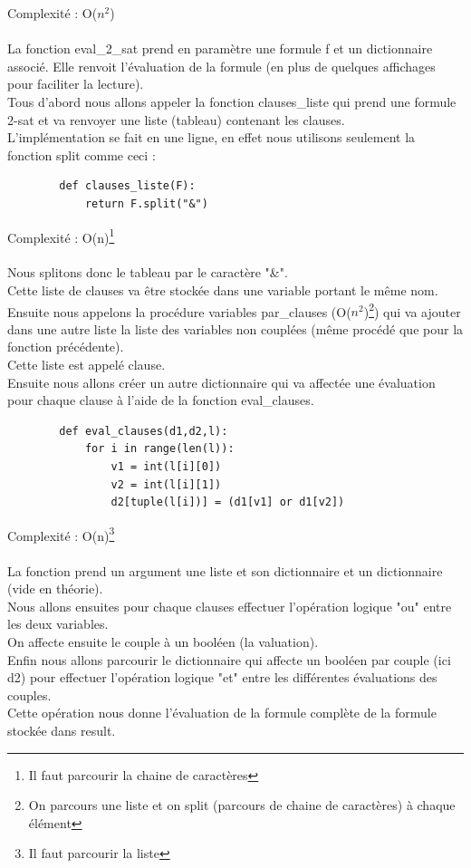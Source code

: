 \documentclass{article}
\begin{document}
    Complexité : O($n^2$) \\ \\
    La fonction eval\_2\_sat prend en paramètre une formule f et un dictionnaire associé. Elle renvoit l'évaluation de la formule (en plus de quelques affichages pour faciliter la lecture). \\
    Tous d'abord nous allons appeler la fonction clauses\_liste qui prend une formule 2-sat et va renvoyer une liste (tableau) contenant les clauses. \\
    L'implémentation se fait en une ligne, en effet nous utilisons seulement la fonction split comme ceci : 
    \begin{lstlisting}
        def clauses_liste(F):
            return F.split("&") 
    \end{lstlisting}
    Complexité : O(n)\footnote{Il faut parcourir la chaine de caractères} \\
    \\
    Nous splitons donc le tableau par le caractère "\&". \\
    Cette liste de clauses va être stockée dans une variable portant le même nom. \\ 
    Ensuite nous appelons la procédure variables par\_clauses (O($n^2$)\footnote{On parcours une liste et on split (parcours de chaine de caractères) à chaque élément}) qui va ajouter dans une autre liste la liste des variables non couplées (même procédé que pour la fonction précédente). \\
    Cette liste est appelé clause. \\
    Ensuite nous allons créer un autre dictionnaire qui va affectée une évaluation pour chaque clause à l'aide de la fonction eval\_clauses. \\
    \begin{lstlisting}
        def eval_clauses(d1,d2,l):
            for i in range(len(l)):
                v1 = int(l[i][0])
                v2 = int(l[i][1])
                d2[tuple(l[i])] = (d1[v1] or d1[v2])
    \end{lstlisting}
    Complexité : O(n)\footnote{Il faut parcourir la liste} \\
    \\
    La fonction prend un argument une liste et son dictionnaire et un dictionnaire (vide en théorie). \\
    Nous allons ensuites pour chaque clauses effectuer l'opération logique "ou" entre les deux variables. \\
    On affecte ensuite le couple à un booléen (la valuation). \\
    Enfin nous allons parcourir le dictionnaire qui affecte un booléen par couple (ici d2) pour effectuer l'opération logique "et" entre les différentes évaluations des couples. \\
    Cette opération nous donne l'évaluation de la formule complète de la formule stockée dans result.   
\end{document}
